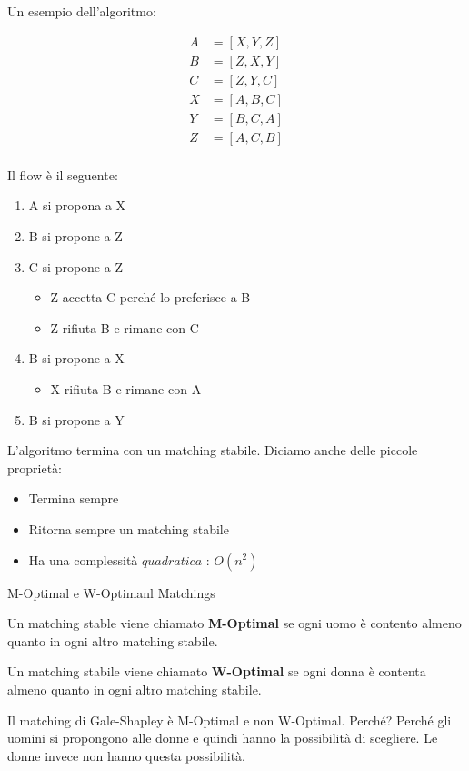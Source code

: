 Un esempio dell'algoritmo:

\begin{equation}
    \begin{aligned}
        A & = [X,Y,Z]\\
        B & = [Z,X,Y]\\
        C & = [Z,Y,C]\\
        X & = [A,B,C]\\
        Y & = [B,C,A]\\
        Z & = [A,C,B]\\
    \end{aligned}
\end{equation}

Il flow è il seguente:

\begin{enumerate}
    \item A si propona a X
    \item B si propone a Z
    \item C si propone a Z
    \begin{itemize}
        \item Z accetta C perché lo preferisce a B
        \item Z rifiuta B e rimane con C
    \end{itemize}
    \item B si propone a X
    \begin{itemize}
        \item X rifiuta B e rimane con A
    \end{itemize}
    \item B si propone a Y
\end{enumerate}

L'algoritmo termina con un matching stabile. Diciamo anche delle piccole proprietà:

\begin{itemize}
    \item Termina sempre 
    \item Ritorna sempre un matching stabile
    \item Ha una complessità $quadratica$ : $O(n^2)$
\end{itemize}

\begin{definition}
    M-Optimal e W-Optimanl Matchings

    Un matching stable viene chiamato \textbf{M-Optimal} se ogni uomo è contento almeno quanto in ogni altro matching stabile.

    Un matching stabile viene chiamato \textbf{W-Optimal} se ogni donna è contenta almeno quanto in ogni altro matching stabile.
\end{definition}

Il matching di Gale-Shapley è M-Optimal e non W-Optimal. Perché? Perché
gli uomini si propongono alle donne e quindi hanno la possibilità di
scegliere. Le donne invece non hanno questa possibilità.

\newpage